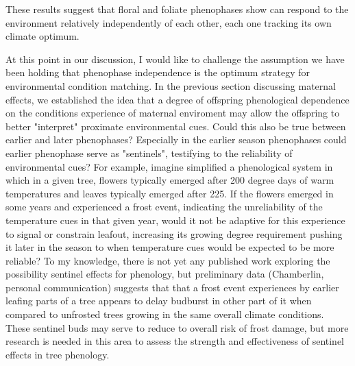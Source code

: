 \documentclass{article}\usepackage[]{graphicx}\usepackage[]{color}
\begin{document}
These results suggest that floral and foliate phenophases show can respond to the environment relatively independently of each other, each one tracking its own climate optimum. 
\par At this point in our discussion, I would like to challenge the assumption we have been holding that phenophase independence is the optimum strategy for environmental condition matching. In the previous section discussing maternal effects, we established the idea that a degree of offspring phenological dependence on the conditions experience of maternal enviroment may allow the offspring to better "interpret" proximate environmental cues. Could this also be true between earlier and later phenophases? Especially in the earlier season phenophases could earlier phenophase serve as "sentinels", testifying to the reliability of environmental cues? For example, imagine simplified a phenological system in which in a given tree, flowers typically emerged after 200 degree days of warm temperatures and leaves typically emerged after 225. If the flowers emerged in some years and experienced a frost event, indicating the unreliability of the temperature cues in that given year,  would it not be adaptive for this experience to signal or constrain leafout, increasing its growing degree requirement pushing it later in the season to when temperature cues would be expected to be more reliable? To my knowledge, there is not yet any published work exploring the possibility sentinel effects for phenology, but preliminary data (Chamberlin, personal communication) suggests that that a frost event experiences by earlier leafing parts of a tree appears to delay budburst in other part of it when compared to unfrosted trees growing in the same overall climate conditions. These sentinel buds may serve to reduce to overall risk of frost damage, but more research is needed in this area to assess the strength and effectiveness of sentinel effects in tree phenology.
\end{document}

